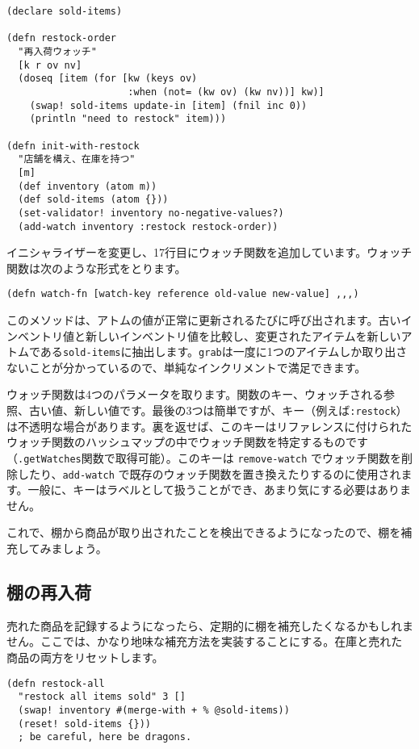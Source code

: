 \begin{lstlisting}[]
(declare sold-items)

(defn restock-order
  "再入荷ウォッチ"
  [k r ov nv]
  (doseq [item (for [kw (keys ov)
                     :when (not= (kw ov) (kw nv))] kw)]
    (swap! sold-items update-in [item] (fnil inc 0))
    (println "need to restock" item)))

(defn init-with-restock
  "店舗を構え、在庫を持つ"
  [m]
  (def inventory (atom m))
  (def sold-items (atom {}))
  (set-validator! inventory no-negative-values?)
  (add-watch inventory :restock restock-order))
\end{lstlisting}

イニシャライザーを変更し、17行目にウォッチ関数を追加しています。ウォッチ関数は次のような形式をとります。

\begin{lstlisting}[numbers=none]
(defn watch-fn [watch-key reference old-value new-value] ,,,)
\end{lstlisting}

このメソッドは、アトムの値が正常に更新されるたびに呼び出されます。古いインベントリ値と新しいインベントリ値を比較し、変更されたアイテムを新しいアトムである\texttt{sold-items}に抽出します。\texttt{grab}は一度に1つのアイテムしか取り出さないことが分かっているので、単純なインクリメントで満足できます。

ウォッチ関数は4つのパラメータを取ります。関数のキー、ウォッチされる参照、古い値、新しい値です。最後の3つは簡単ですが、キー（例えば\texttt{:restock}）は不透明な場合があります。裏を返せば、このキーはリファレンスに付けられたウォッチ関数のハッシュマップの中でウォッチ関数を特定するものです（\texttt{.getWatches}関数で取得可能）。このキーは \texttt{remove-watch} でウォッチ関数を削除したり、\texttt{add-watch} で既存のウォッチ関数を置き換えたりするのに使用されます。一般に、キーはラベルとして扱うことができ、あまり気にする必要はありません。

これで、棚から商品が取り出されたことを検出できるようになったので、棚を補充してみましょう。

\subsection{棚の再入荷}

売れた商品を記録するようになったら、定期的に棚を補充したくなるかもしれません。ここでは、かなり地味な補充方法を実装することにする。在庫と売れた商品の両方をリセットします。



\begin{lstlisting}[numbers=none]
(defn restock-all
  "restock all items sold" 3 []
  (swap! inventory #(merge-with + % @sold-items))
  (reset! sold-items {}))
  ; be careful, here be dragons.
\end{lstlisting}





